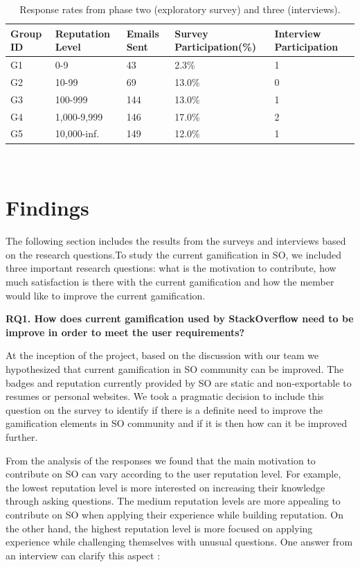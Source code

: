 \documentclass{sigchi}
\begin{document}
\begin{table}
	\centering
	\begin{tabular}{ p{1.0cm} p{1.6cm} p{0.9cm} p{1.8cm} p{1.4cm} }
	\toprule
	\textbf{Group ID} & \textbf{Reputation Level} & \textbf{Emails Sent} & \textbf{Survey Participation(\%)} & \textbf{Interview Participation } \\
	\midrule
	G1 & 0-9 & 43 & 2.3\% & 1 \\
	G2 & 10-99 & 69 & 13.0\% & 0 \\
	G3 & 100-999 & 144 & 13.0\% & 1 \\
	G4 & 1,000-9,999 & 146 & 17.0\% & 2 \\
	G5 & 10,000-inf. & 149 & 12.0\% & 1 \\
	\bottomrule
	\end{tabular}
	\caption{Response rates from phase two (exploratory survey) and three (interviews).}~\label{tab:table1}
\end{table}

\section{Findings}

The following section includes the results from the surveys and interviews based on the research questions.To study the current gamification in SO, we included three important research questions: what is the motivation to contribute, how much satisfaction is there with the current gamification and how the member would like to improve the current gamification.

\textbf{RQ1. How does current gamification used by StackOverflow need to be improve in order to meet the user requirements?}

At the inception of the project, based on the discussion with our team we hypothesized that current gamification in SO community can be improved. The badges and reputation currently provided by SO are static and non-exportable to resumes or personal websites. We took a pragmatic decision to include this question on the survey to identify if there is a definite need to improve the gamification elements in SO community and if it is then how can it be improved further.

From the analysis of the responses we found that the main motivation to contribute on SO can vary according to the user reputation level. For example, the lowest reputation level is more interested on increasing their knowledge through asking questions. The medium reputation levels are more appealing to contribute on SO when applying their experience while building reputation. On the other hand, the highest reputation level is more focused on applying experience while challenging themselves with unusual questions. One answer from an interview can clarify this aspect :
\end{document}
